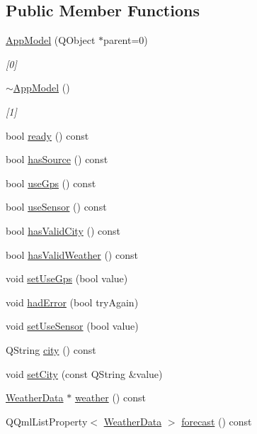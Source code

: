 \subsection*{Public Member Functions}
\begin{DoxyCompactItemize}
\item 
\hyperlink{class_app_model_affb3ea459bceb0650cdc810f3f5a2256}{App\+Model} (Q\+Object $\ast$parent=0)
\begin{DoxyCompactList}\small\item\em \mbox{[}0\mbox{]} \end{DoxyCompactList}\item 
\hyperlink{class_app_model_a67ab3004ccbe2822a8a0abb9fa96ace3}{$\sim$\+App\+Model} ()
\begin{DoxyCompactList}\small\item\em \mbox{[}1\mbox{]} \end{DoxyCompactList}\item 
bool \hyperlink{class_app_model_a3917fdc3dd8c97715991d9fd1a23abcc}{ready} () const
\item 
bool \hyperlink{class_app_model_a8ad68e982b0a307d9986ff538baedbd2}{has\+Source} () const
\item 
bool \hyperlink{class_app_model_a0e6e7506ba084133a6927d8c633ad699}{use\+Gps} () const
\item 
bool \hyperlink{class_app_model_a5b83f8c93976273d6e9f1664e62efe63}{use\+Sensor} () const
\item 
bool \hyperlink{class_app_model_aedeadab67d9bc5f5dfead369f66c3912}{has\+Valid\+City} () const
\item 
bool \hyperlink{class_app_model_a6ec5b34a1839a7141979709418174ad1}{has\+Valid\+Weather} () const
\item 
void \hyperlink{class_app_model_a81c3ffb3370837086366c9f70bb3d5eb}{set\+Use\+Gps} (bool value)
\item 
void \hyperlink{class_app_model_ac5fe590924b727724d9c686bb2552ed8}{had\+Error} (bool try\+Again)
\item 
void \hyperlink{class_app_model_ad1369130f74b4aabd0ac0d6b1b030014}{set\+Use\+Sensor} (bool value)
\item 
Q\+String \hyperlink{class_app_model_a093066c81b5fe2c1361df8fd19a21f51}{city} () const
\item 
void \hyperlink{class_app_model_ad0135d4a1551b6484ac28c434f861af5}{set\+City} (const Q\+String \&value)
\item 
\hyperlink{class_weather_data}{Weather\+Data} $\ast$ \hyperlink{class_app_model_a70a5bec8e359e4edbd16611efa96cf32}{weather} () const
\item 
Q\+Qml\+List\+Property$<$ \hyperlink{class_weather_data}{Weather\+Data} $>$ \hyperlink{class_app_model_aa9209b2390924841a009ab0d22b9a1b3}{forecast} () const
\end{DoxyCompactItemize}
